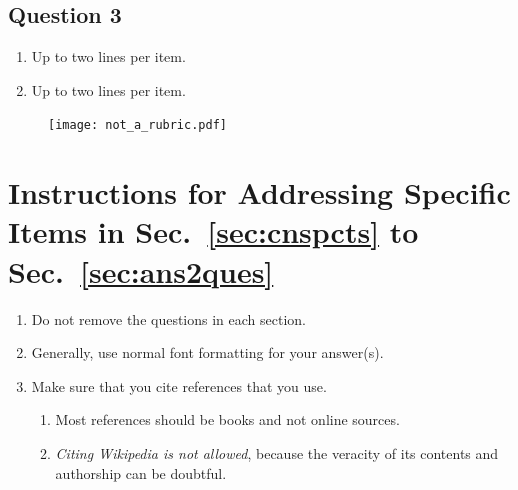 \subsection{Question 3}  
\begin{enumerate}
\item Up to two lines per item.
\item Up to two lines per item.
\end{enumerate}	







\newpage
\begin{figure}[!t]
	\texttt{[image: not\_a\_rubric.pdf]} %
\end{figure}
\cleardoublepage























\appendices

\section{Instructions for Addressing Specific Items in Sec.~\ref{sec:cnspcts} to Sec.~\ref{sec:ans2ques}}

\begin{enumerate}

	\item Do not remove the questions in each section.
	
	\item Generally, use normal font formatting for your answer(s).

	\item Make sure that you cite references that you use. 
		
	\begin{enumerate}
		\item  Most references should be books and not online sources. 
		
		\item \emph{Citing Wikipedia is not allowed}, because the veracity of its contents and authorship can be doubtful.
	\end{enumerate}
	
\end{enumerate}





